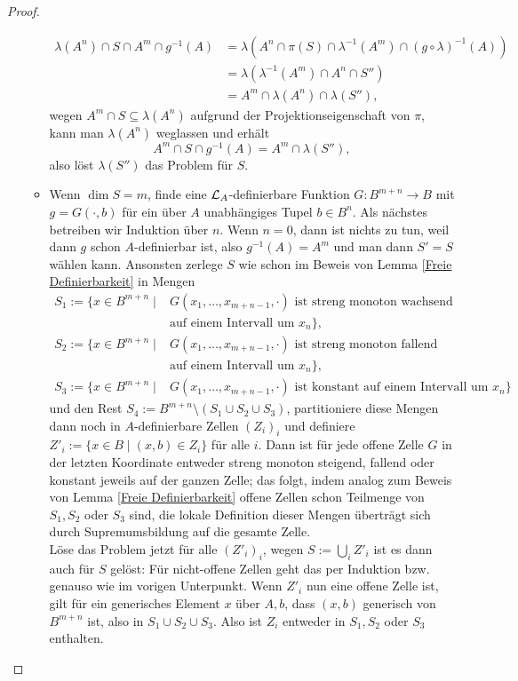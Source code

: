 \begin{proof}
\begin{itemize}
\begin{itemize}
			\begin{align*}
			\lambda(A^n)\cap S\cap A^m\cap g^{-1}(A)&=\lambda(A^n\cap\pi(S)\cap\lambda^{-1}(A^m)\cap (g\circ\lambda)^{-1}(A))\\
			&=\lambda(\lambda^{-1}(A^m)\cap A^n\cap S'')\\
			&=A^m\cap\lambda(A^n)\cap\lambda(S''),
			\end{align*}
			wegen $A^m\cap S\subseteq\lambda(A^n)$ aufgrund der Projektionseigenschaft von $\pi$, kann man $\lambda(A^n)$ weglassen und erhält $$A^m\cap S\cap g^{-1}(A)=A^m\cap\lambda(S''),$$
			also löst $\lambda(S'')$ das Problem für $S$.
			\newpage
			\item Wenn $\dim S=m$, finde eine $\mathcal{L}_A$-definierbare Funktion $G:B^{m+n}\rightarrow B$ mit $g=G(\cdot,b)$ für ein über $A$ unabhängiges Tupel $b\in B^n$. Als nächstes betreiben wir Induktion über $n$. Wenn $n=0$, dann ist nichts zu tun, weil dann $g$ schon $A$-definierbar ist, also $g^{-1}(A)=A^m$ und man dann $S'=S$ wählen kann. Ansonsten zerlege $S$ wie schon im Beweis von Lemma \ref{Freie Definierbarkeit} in Mengen
			\begin{align*}
			S_1:=\{x\in B^{m+n}\mid&G(x_1,\dots,x_{m+n-1},\cdot)\text{ ist streng monoton wachsend }\\&\text{auf einem Intervall um }x_n\},\\S_2:=\{x\in B^{m+n}\mid&G(x_1,\dots,x_{m+n-1},\cdot)\text{ ist streng monoton fallend }\\&\text{auf einem Intervall um }x_n\},\\S_3:=\{x\in B^{m+n}\mid&G(x_1,\dots,x_{m+n-1},\cdot)\text{ ist konstant auf einem Intervall um }x_n\}
			\end{align*}
			und den Rest $S_4:=B^{m+n}\setminus(S_1\cup S_2\cup S_3)$, partitioniere diese Mengen dann noch in $A$-definierbare Zellen $(Z_i)_i$ und definiere $Z'_i:=\{x\in B\mid (x,b)\in Z_i\}$ für alle $i$. Dann ist für jede offene Zelle $G$ in der letzten Koordinate entweder streng monoton steigend, fallend oder konstant jeweils auf der ganzen Zelle; das folgt, indem analog zum Beweis von Lemma \ref{Freie Definierbarkeit} offene Zellen schon Teilmenge von $S_1,S_2$ oder $S_3$ sind, die lokale Definition dieser Mengen überträgt sich durch Supremumsbildung auf die gesamte Zelle.\\
			Löse das Problem jetzt für alle $(Z'_i)_i$, wegen $S:=\bigcup\limits_i Z'_i$ ist es dann auch für $S$ gelöst: Für nicht-offene Zellen geht das per Induktion bzw. genauso wie im vorigen Unterpunkt. Wenn $Z'_i$ nun eine offene Zelle ist, gilt für ein generisches Element $x$ über $A,b$, dass $(x,b)$ generisch von $B^{m+n}$ ist, also in $S_1\cup S_2\cup S_3$. Also ist $Z_i$ entweder in $S_1,S_2$ oder $S_3$ enthalten.

\end{itemize}
\end{itemize}
\end{proof}
